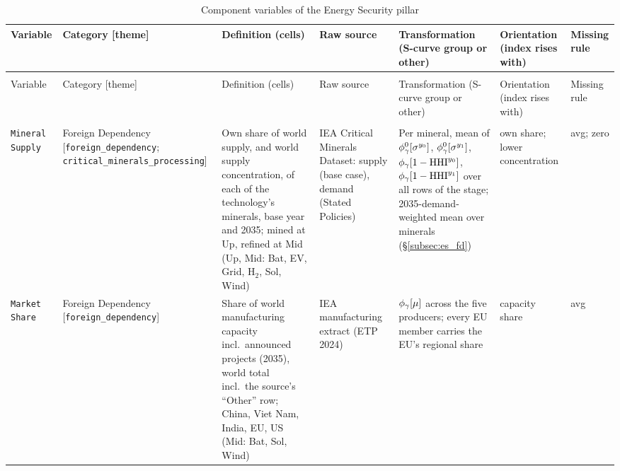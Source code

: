 \begin{landscape}
\scriptsize
\setlength{\tabcolsep}{3.5pt}
\renewcommand{\arraystretch}{1.1}
\begin{longtable}{@{}>{\raggedright\arraybackslash}p{2.7cm}
  >{\raggedright\arraybackslash}p{2.4cm}
  >{\raggedright\arraybackslash}p{5.3cm}
  >{\raggedright\arraybackslash}p{3.0cm}
  >{\raggedright\arraybackslash}p{4.7cm}
  >{\raggedright\arraybackslash}p{2.0cm}
  >{\raggedright\arraybackslash}p{1.1cm}@{}}
\caption{Component variables of the Energy Security pillar}\label{tab:app_es_variables}\\
\toprule
Variable & Category [theme] & Definition (cells) & Raw source & Transformation (S-curve group or
  other) & Orientation (index rises with) & Missing rule\\
\midrule
\endfirsthead
\multicolumn{7}{@{}l}{\textit{Table~\ref{tab:app_es_variables} (continued)}}\\
\toprule
Variable & Category [theme] & Definition (cells) & Raw source & Transformation (S-curve group or
  other) & Orientation (index rises with) & Missing rule\\
\midrule
\endhead
\midrule
\multicolumn{7}{r@{}}{\textit{Continued on next page}}\\
\endfoot
\bottomrule
\endlastfoot
%
\texttt{Mineral Supply} & Foreign Dependency [\texttt{foreign\_\allowbreak dependency};
  \texttt{critical\_\allowbreak minerals\_\allowbreak processing}] &
  Own share of world supply, and world supply concentration, of each of the technology's
  minerals, base year and 2035; mined at Up, refined at Mid (Up, Mid: Bat, EV, Grid, H$_2$, Sol,
  Wind) &
  IEA Critical Minerals Dataset: supply (base case), demand (Stated Policies) &
  Per mineral, mean of $\phi_{\gamma}^{0}[\sigma^{y_0}]$, $\phi_{\gamma}^{0}[\sigma^{y_1}]$,
  $\phi_{\gamma}[1-\mathrm{HHI}^{y_0}]$, $\phi_{\gamma}[1-\mathrm{HHI}^{y_1}]$ over all rows of the stage; 2035-demand-weighted
  mean over minerals (\S\ref{subsec:es_fd}) &
  own share; lower concentration & avg; zero\\
\texttt{Market Share} & Foreign Dependency [\texttt{foreign\_\allowbreak dependency}] &
  Share of world manufacturing capacity incl.\ announced projects (2035), world total incl.\ the
  source's ``Other'' row; China, Viet Nam, India, EU, US (Mid: Bat, Sol, Wind) &
  IEA manufacturing extract (ETP 2024) &
  $\phi_{\gamma}[\mu]$ across the five producers; every EU member carries the EU's regional share &
  capacity share & avg\\

\end{longtable}
\end{landscape}
